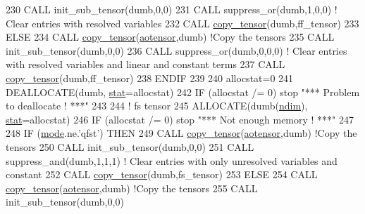 \begin{DoxyCode}
230         \textcolor{keyword}{CALL }init\_sub\_tensor(dumb,0,0)
231         \textcolor{keyword}{CALL }suppress\_or(dumb,1,0,0) \textcolor{comment}{! Clear entries with resolved variables}
232         \textcolor{keyword}{CALL }\hyperlink{namespacetensor_a4a88ee8077278486c5128ad97617969e}{copy\_tensor}(dumb,ff\_tensor)
233     \textcolor{keywordflow}{ELSE}
234         \textcolor{keyword}{CALL }\hyperlink{namespacetensor_a4a88ee8077278486c5128ad97617969e}{copy\_tensor}(\hyperlink{namespaceaotensor__def_a0dc43bc9294a18f2fe57b67489f1702f}{aotensor},dumb) \textcolor{comment}{!Copy the tensors}
235         \textcolor{keyword}{CALL }init\_sub\_tensor(dumb,0,0)
236         \textcolor{keyword}{CALL }suppress\_or(dumb,0,0,0) \textcolor{comment}{! Clear entries with resolved variables and linear and constant terms}
237         \textcolor{keyword}{CALL }\hyperlink{namespacetensor_a4a88ee8077278486c5128ad97617969e}{copy\_tensor}(dumb,ff\_tensor)
238 \textcolor{keywordflow}{    ENDIF}
239 
240     allocstat=0
241     \textcolor{keyword}{DEALLOCATE}(dumb, \hyperlink{namespacestat}{stat}=allocstat)
242     \textcolor{keywordflow}{IF} (allocstat /= 0)  stop \textcolor{stringliteral}{"*** Problem to deallocate ! ***"}
243 
244     \textcolor{comment}{! fs tensor}
245     \textcolor{keyword}{ALLOCATE}(dumb(\hyperlink{namespaceparams_a2323fe1773f086e20c14f266351c482b}{ndim}), \hyperlink{namespacestat}{stat}=allocstat)
246     \textcolor{keywordflow}{IF} (allocstat /= 0) stop \textcolor{stringliteral}{"*** Not enough memory ! ***"}
247 
248     \textcolor{keywordflow}{IF} (\hyperlink{namespacestoch__params_a2c3f6439fd2d66413d065b533f2a6263}{mode}.ne.\textcolor{stringliteral}{'qfst'}) \textcolor{keywordflow}{THEN}
249         \textcolor{keyword}{CALL }\hyperlink{namespacetensor_a4a88ee8077278486c5128ad97617969e}{copy\_tensor}(\hyperlink{namespaceaotensor__def_a0dc43bc9294a18f2fe57b67489f1702f}{aotensor},dumb) \textcolor{comment}{!Copy the tensors}
250         \textcolor{keyword}{CALL }init\_sub\_tensor(dumb,0,0)
251         \textcolor{keyword}{CALL }suppress\_and(dumb,1,1,1) \textcolor{comment}{! Clear entries with only unresolved variables and constant}
252         \textcolor{keyword}{CALL }\hyperlink{namespacetensor_a4a88ee8077278486c5128ad97617969e}{copy\_tensor}(dumb,fs\_tensor)
253     \textcolor{keywordflow}{ELSE}
254         \textcolor{keyword}{CALL }\hyperlink{namespacetensor_a4a88ee8077278486c5128ad97617969e}{copy\_tensor}(\hyperlink{namespaceaotensor__def_a0dc43bc9294a18f2fe57b67489f1702f}{aotensor},dumb) \textcolor{comment}{!Copy the tensors}
255         \textcolor{keyword}{CALL }init\_sub\_tensor(dumb,0,0)

\end{DoxyCode}
